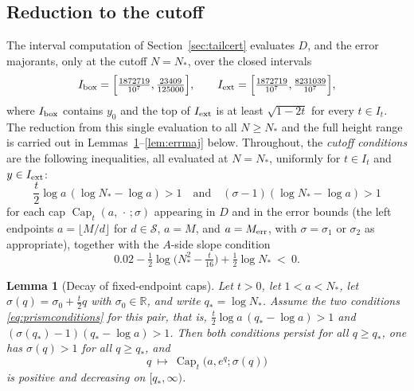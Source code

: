 \documentclass[11pt]{article}
\newtheorem{lemma}[theorem]{Lemma}
\theoremstyle{definition}
\newcommand{\R}{\mathbb{R}}
\newcommand{\calS}{\mathcal{S}}
\newcommand{\CapT}{\operatorname{Cap}}
\begin{document}
\subsection{Reduction to the cutoff}\label{sec:tailmono}

The interval computation of Section~\ref{sec:tailcert} evaluates
$D$, and the error majorants, only at the cutoff $N=N_*$, over the
closed intervals
\[
I_{\rm box}=\Bigl[\tfrac{1872719}{10^7},\tfrac{23409}{125000}\Bigr],
\qquad
I_{\rm ext}=\Bigl[\tfrac{1872719}{10^7},\tfrac{8231039}{10^7}\Bigr],
\]
where $I_{\rm box}$ contains $y_0$ and the top of $I_{\rm ext}$ is
at least $\sqrt{1-2t}$ for every $t\in I_t$. The reduction from
this single evaluation to all $N\ge N_*$ and the full height range
is carried out in Lemmas~\ref{lem:capdecay}--\ref{lem:errmaj}
below. Throughout, the \emph{cutoff conditions} are the following
inequalities, all evaluated at $N=N_*$, uniformly for $t\in I_t$ and
$y\in I_{\rm ext}$:
\begin{equation}\label{eq:prismconditions}
\frac t2\log a\,(\log N_*-\log a)>1
\quad\text{and}\quad
(\sigma-1)(\log N_*-\log a)>1
\end{equation}
for each cap $\CapT_t(a,\,\cdot\,;\sigma)$ appearing in $D$ and in
the error bounds (the left endpoints $a=\lfloor M/d\rfloor$ for
$d\in\calS$, $a=M$, and $a=M_{\rm err}$, with $\sigma=\sigma_1$ or
$\sigma_2$ as appropriate), together with the $A$-side slope
condition
\begin{equation}\label{eq:ym}
0.02-\tfrac12\log\bigl(N_*^2-\tfrac t{16}\bigr)+\tfrac12\log N_*\ <\ 0 .
\end{equation}

\begin{lemma}[Decay of fixed-endpoint caps]\label{lem:capdecay}
Let $t>0$, let $1<a<N_*$, let $\sigma(q)=\sigma_0+\frac t2q$ with
$\sigma_0\in\R$, and write $q_*=\log N_*$. Assume the two
conditions \eqref{eq:prismconditions} for this pair, that is,
$\frac t2\log a\,(q_*-\log a)>1$ and
$(\sigma(q_*)-1)(q_*-\log a)>1$. Then both conditions persist for
all $q\ge q_*$, one has $\sigma(q)>1$ for all $q\ge q_*$, and
\[
q\ \longmapsto\ \CapT_t\bigl(a,e^q;\sigma(q)\bigr)
\]
is positive and decreasing on $[q_*,\infty)$.
\end{lemma}
\end{document}
